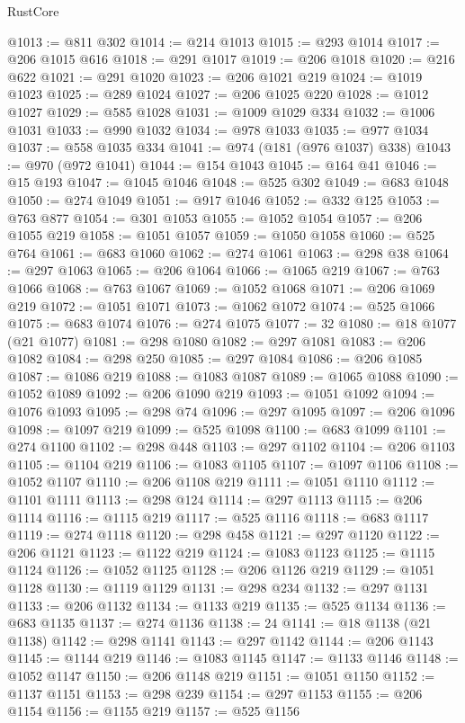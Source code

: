 \begin{lexlean}{RustCore}
\begin{coremodule}
@1013 := @811 @302
@1014 := @214 @1013
@1015 := @293 @1014
@1017 := @206 @1015 @616
@1018 := @291 @1017
@1019 := @206 @1018
@1020 := @216 @622
@1021 := @291 @1020
@1023 := @206 @1021 @219
@1024 := @1019 @1023
@1025 := @289 @1024
@1027 := @206 @1025 @220
@1028 := @1012 @1027
@1029 := @585 @1028
@1031 := @1009 @1029 @334
@1032 := @1006 @1031
@1033 := @990 @1032
@1034 := @978 @1033
@1035 := @977 @1034
@1037 := @558 @1035 @334
@1041 := @974 (@181 (@976 @1037) @338)
@1043 := @970 (@972 @1041)
@1044 := @154 @1043
@1045 := @164 @41
@1046 := @15 @193
@1047 := @1045 @1046
@1048 := @525 @302
@1049 := @683 @1048
@1050 := @274 @1049
@1051 := @917 @1046
@1052 := @332 @125
@1053 := @763 @877
@1054 := @301 @1053
@1055 := @1052 @1054
@1057 := @206 @1055 @219
@1058 := @1051 @1057
@1059 := @1050 @1058
@1060 := @525 @764
@1061 := @683 @1060
@1062 := @274 @1061
@1063 := @298 @38
@1064 := @297 @1063
@1065 := @206 @1064
@1066 := @1065 @219
@1067 := @763 @1066
@1068 := @763 @1067
@1069 := @1052 @1068
@1071 := @206 @1069 @219
@1072 := @1051 @1071
@1073 := @1062 @1072
@1074 := @525 @1066
@1075 := @683 @1074
@1076 := @274 @1075
@1077 := 32
@1080 := @18 @1077 (@21 @1077)
@1081 := @298 @1080
@1082 := @297 @1081
@1083 := @206 @1082
@1084 := @298 @250
@1085 := @297 @1084
@1086 := @206 @1085
@1087 := @1086 @219
@1088 := @1083 @1087
@1089 := @1065 @1088
@1090 := @1052 @1089
@1092 := @206 @1090 @219
@1093 := @1051 @1092
@1094 := @1076 @1093
@1095 := @298 @74
@1096 := @297 @1095
@1097 := @206 @1096
@1098 := @1097 @219
@1099 := @525 @1098
@1100 := @683 @1099
@1101 := @274 @1100
@1102 := @298 @448
@1103 := @297 @1102
@1104 := @206 @1103
@1105 := @1104 @219
@1106 := @1083 @1105
@1107 := @1097 @1106
@1108 := @1052 @1107
@1110 := @206 @1108 @219
@1111 := @1051 @1110
@1112 := @1101 @1111
@1113 := @298 @124
@1114 := @297 @1113
@1115 := @206 @1114
@1116 := @1115 @219
@1117 := @525 @1116
@1118 := @683 @1117
@1119 := @274 @1118
@1120 := @298 @458
@1121 := @297 @1120
@1122 := @206 @1121
@1123 := @1122 @219
@1124 := @1083 @1123
@1125 := @1115 @1124
@1126 := @1052 @1125
@1128 := @206 @1126 @219
@1129 := @1051 @1128
@1130 := @1119 @1129
@1131 := @298 @234
@1132 := @297 @1131
@1133 := @206 @1132
@1134 := @1133 @219
@1135 := @525 @1134
@1136 := @683 @1135
@1137 := @274 @1136
@1138 := 24
@1141 := @18 @1138 (@21 @1138)
@1142 := @298 @1141
@1143 := @297 @1142
@1144 := @206 @1143
@1145 := @1144 @219
@1146 := @1083 @1145
@1147 := @1133 @1146
@1148 := @1052 @1147
@1150 := @206 @1148 @219
@1151 := @1051 @1150
@1152 := @1137 @1151
@1153 := @298 @239
@1154 := @297 @1153
@1155 := @206 @1154
@1156 := @1155 @219
@1157 := @525 @1156

\end{coremodule}
\end{lexlean}
